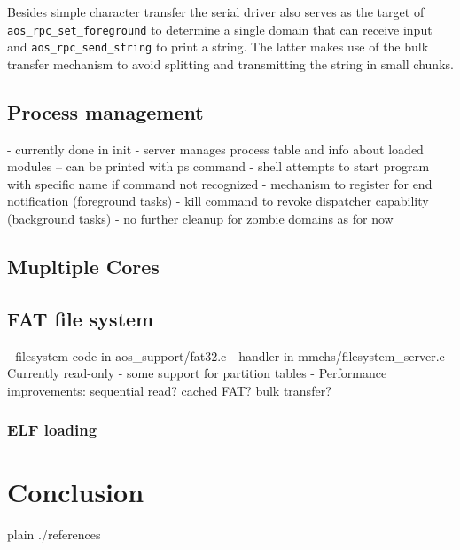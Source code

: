 \documentclass[a4paper,10pt]{article}
\begin{document}
Besides simple character transfer the serial driver also serves as the target of \lstinline!aos_rpc_set_foreground! to determine a single domain that can receive input and \lstinline!aos_rpc_send_string! to print a string.
The latter makes use of the bulk transfer mechanism to avoid splitting and transmitting the string in small chunks.


\subsection{Process management}
\label{sec:process-management}
- currently done in init
- server manages process table and info about loaded modules
-- can be printed with ps command
- shell attempts to start program with specific name if command not recognized
- mechanism to register for end notification (foreground tasks)
- kill command to revoke dispatcher capability (background tasks)
- no further cleanup for zombie domains as for now

\subsection{Mupltiple Cores}

\todo {}

\subsection{FAT file system}
- filesystem code in aos\_support/fat32.c
- handler in mmchs/filesystem\_server.c
- Currently read-only
- some support for partition tables
- Performance improvements: sequential read? cached FAT? bulk transfer?

\subsubsection{ ELF loading}


\section{Conclusion}

\begin{flushleft}
{{{
 {plain}
 {./references}
}}}
\end{flushleft}


\todos
\end{document}

